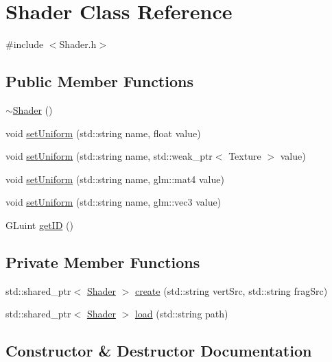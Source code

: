 \hypertarget{class_shader}{}\section{Shader Class Reference}
\label{class_shader}


{\ttfamily \#include $<$Shader.\+h$>$}

\subsection*{Public Member Functions}
\begin{DoxyCompactItemize}
\item 
\hyperlink{class_shader_aff01df87e8a102f270b5b135a295e59d}{$\sim$\+Shader} ()
\item 
void \hyperlink{class_shader_a6826cb5394def93884540565ffa4df7d}{set\+Uniform} (std\+::string name, float value)
\item 
void \hyperlink{class_shader_a94dca1a3185ca11e8e0ca7f77c3ecb34}{set\+Uniform} (std\+::string name, std\+::weak\+\_\+ptr$<$ Texture $>$ value)
\item 
void \hyperlink{class_shader_a3f94c37778540d4d0d7ff107936e3750}{set\+Uniform} (std\+::string name, glm\+::mat4 value)
\item 
void \hyperlink{class_shader_ad97eff9ea48cee42227e31c56cd7479e}{set\+Uniform} (std\+::string name, glm\+::vec3 value)
\item 
G\+Luint \hyperlink{class_shader_ad1bc9a16400499ec80c4f716a390abaf}{get\+ID} ()
\end{DoxyCompactItemize}
\subsection*{Private Member Functions}
\begin{DoxyCompactItemize}
\item 
std\+::shared\+\_\+ptr$<$ \hyperlink{class_shader}{Shader} $>$ \hyperlink{class_shader_af67abb9216bbd4729181ed6cf8260baf}{create} (std\+::string vert\+Src, std\+::string frag\+Src)
\item 
std\+::shared\+\_\+ptr$<$ \hyperlink{class_shader}{Shader} $>$ \hyperlink{class_shader_ab80e1350b80a6f6ccc3e28aca8ca3536}{load} (std\+::string path)
\end{DoxyCompactItemize}


\subsection{Constructor \& Destructor Documentation}
\mbox{\label{class_shader_aff01df87e8a102f270b5b135a295e59d}} 
